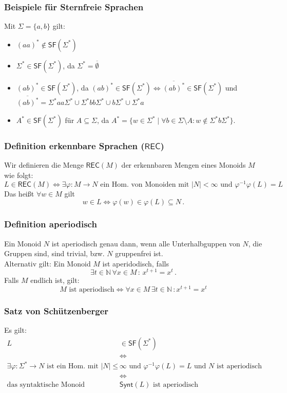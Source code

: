 \documentclass[12pt, german]{article}
\newcommand{\N}{\mathbb{N}}
\newcommand{\sigstern}{\Sigma^\ast}
\newcommand{\inv}{^{-1}}
\newcommand{\rec}{\mathsf{REC}}
\newcommand{\starfree}{\mathsf{SF}}
\newcommand{\synt}{\mathsf{Synt}}
\begin{document}
	\subsubsection{Beispiele für Sternfreie Sprachen}
	Mit $\Sigma = \{a,b\}$ gilt:
	\begin{itemize}
		\item $(aa)^\ast \not\in \starfree(\sigstern)$
				\item $\sigstern \in \starfree(\sigstern)$, da $\sigstern = \overline{\emptyset}$
		\item $(ab)^\ast \in \starfree(\sigstern)$, da $(ab)^\ast \in \starfree(\sigstern) \iff \overline{(ab)^\ast}\in \starfree(\sigstern)$ und $\overline{(ab)^\ast} = \sigstern aa \sigstern \cup \sigstern bb \sigstern \cup b\sigstern \cup \sigstern a$
		\item $A^\ast \in \starfree(\sigstern)$ für $A\subseteq \Sigma$, da $A^\ast = \{ w \in \sigstern \mid \forall b \in \Sigma \setminus A : w \notin \sigstern b\sigstern\}$.
	\end{itemize}
	
	
	
	\subsubsection{Definition erkennbare Sprachen ($\rec$)}
	\label{sec:rec}
	Wir definieren die Menge $\rec(M)$ der erkennbaren Mengen eines Monoids $M$ wie folgt:  $$L \in \rec(M) \iff \exists \varphi : M \to N \text{ ein Hom. von Monoiden mit } |N| < \infty \text{ und } \varphi\inv\varphi(L) = L$$
	Das hei\ss t $\forall w \in M$ gilt $$w\in L \iff \varphi(w) \in \varphi(L) \subseteq N\, .$$
	
	\subsubsection{Definition aperiodisch}
	Ein Monoid $N$ ist aperiodisch genau dann, wenn alle Unterhalbguppen von $N$, die Gruppen sind, sind trivial, bzw. $N$ gruppenfrei ist.\\
	Alternativ gilt: Ein Monoid $M$	ist aperidodisch, falls $$\exists t \in \N \, \forall x \in M\, : \, x^{t+1} = x^t \, .$$
	Falls $M$ endlich ist, gilt: $$M \text{ ist aperiodisch} \iff \forall x \in M \, \exists t \in \N \,  : x^{t+1} = x^t$$
	
	
	\subsubsection{Satz von Schützenberger}
	Es gilt: 
	\begin{align*}
		L &\in \starfree(\sigstern)\\
		&\iff \\
		\exists \varphi: \sigstern \to N \text{ ist ein Hom. mit } |N| \leq &\infty \text{ und } \varphi\inv\varphi(L) = L \text{ und $N$ ist aperiodisch} \\ 
		&\iff \\
		\text{das syntaktische Monoid } &\synt(L) \text{ ist aperiodisch}
	\end{align*}
	
\end{document}
